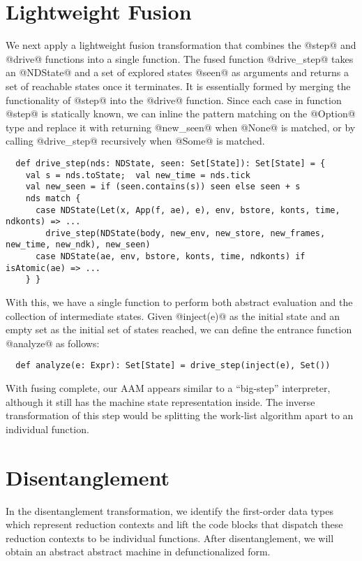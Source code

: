 \documentclass[acmsmall, screen]{acmart}\settopmatter{}
\begin{document}
\section{Lightweight Fusion} \label{fusing}

We next apply a lightweight fusion transformation that combines the @step@ and @drive@
functions into a single function.
The fused function @drive_step@ takes an @NDState@ and a set of explored states @seen@
as arguments and returns a set of reachable states once it terminates.
It is essentially formed by merging the functionality of @step@ into the @drive@ function.
Since each case in function @step@ is statically known, we can inline the pattern matching on the
@Option@ type and replace it with returning @new_seen@ when @None@ is matched, or by calling
@drive_step@ recursively when @Some@ is matched.

\begin{lstlisting}
  def drive_step(nds: NDState, seen: Set[State]): Set[State] = {
    val s = nds.toState;  val new_time = nds.tick
    val new_seen = if (seen.contains(s)) seen else seen + s
    nds match {
      case NDState(Let(x, App(f, ae), e), env, bstore, konts, time, ndkonts) => ...
        drive_step(NDState(body, new_env, new_store, new_frames, new_time, new_ndk), new_seen)
      case NDState(ae, env, bstore, konts, time, ndkonts) if isAtomic(ae) => ...
    } }
\end{lstlisting}

With this, we have a single function to perform both abstract evaluation and the collection of
intermediate states. Given @inject(e)@ as the initial state and an empty set as the
initial set of states reached, we can define the entrance function @analyze@ as follows:

\begin{lstlisting}
  def analyze(e: Expr): Set[State] = drive_step(inject(e), Set())
\end{lstlisting}

With fusing complete, our AAM appears similar to a ``big-step'' interpreter, although it
still has the machine state representation inside. The inverse transformation of this step
would be splitting the work-list algorithm apart to an individual function.

\section{Disentanglement} \label{disen}

In the disentanglement transformation, we identify the first-order data types which represent
reduction contexts and lift the code blocks that dispatch these reduction contexts to be individual
functions.
After disentanglement, we will obtain an abstract abstract machine in defunctionalized form.
\end{document}
